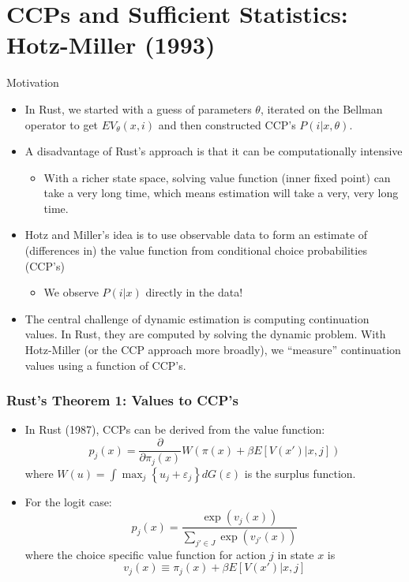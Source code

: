 \documentclass[xcolor=pdftex,dvipsnames,table,mathserif,aspectratio=169]{beamer}
\begin{document}
\section{CCPs and Sufficient Statistics: Hotz-Miller (1993)}


\begin{frame}{Motivation}
\begin{itemize}
	\item In Rust, we started with a guess of parameters $\theta$, iterated on the Bellman operator to get $EV_{\theta}(x,i)$ and then constructed CCP's $P(i | x, \theta)$.
	\item A disadvantage of Rust's approach is that it can be computationally intensive
	\begin{itemize}
	
		\item With a richer state space, solving value function (inner fixed point) 
		can take a very long time,
		which means estimation will take a very, very long time.
	\end{itemize}
	\item Hotz and Miller's idea is to use observable data to form an estimate 
	of (differences in) the value function from conditional choice probabilities (CCP's)
\begin{itemize}
\item We observe $P(i | x)$ directly in the data!
\end{itemize}
	
	\item The central challenge of dynamic estimation is computing continuation values. 
	In Rust, they are computed by solving the dynamic problem.
	With Hotz-Miller (or the CCP approach more broadly), we ``measure'' continuation
	values using a function of CCP's.
	
\end{itemize}
\end{frame}

\begin{frame}
\frametitle{Rust's Theorem 1: Values to CCP's}
\begin{itemize}
	\item In Rust (1987), CCPs can be derived from the value function:\[
		p_{j}\left( x\right) = \frac{\partial}{\partial \pi_{j} \left(x \right)} W\left( \pi\left( x \right) 
		+\beta E\left[V\left(x' \right)|x,j\right]\right)
	\]
	where  $W\left(u\right) = \int \max_{j} \left\{ u_{j} +\varepsilon_{j}\right\}dG\left( \varepsilon\right)$ is the surplus function.

	\medskip
	\item For the logit case:\[
	p_{j}\left(x\right) = \frac{\exp\left(v_{j}\left(x\right)\right)}{\sum_{j'\in J}\exp\left(v_{j'}\left(x\right)\right)}
	\]
	where the choice specific value function for action $j$ in state $x$ is \[
	v_{j}\left(x\right) \equiv \pi_{j}\left(x\right)+\beta E\left[V\left(x' \right)|x,j\right]
	\]
\end{itemize}
\end{frame}
\end{document}
